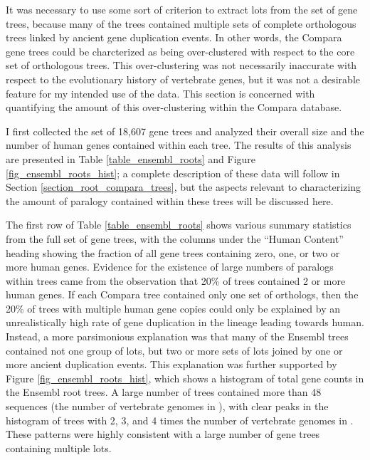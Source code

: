 It was necessary to use some sort of criterion to extract \acp{lot}
from the set of \cmp gene trees, because many of the \cmp trees
contained multiple sets of complete \mammln orthologous trees linked
by ancient gene duplication events. In other words, the Compara gene
trees could be charcterized as being over-clustered with respect to
the core set of \mammln orthologous trees. This over-clustering was
not necessarily inaccurate with respect to the evolutionary history of
vertebrate genes, but it was not a desirable feature for my intended
use of the data. This section is concerned with quantifying the amount
of this over-clustering within the Compara database.

I first collected the set of 18,607 \cmp gene trees and analyzed their
overall size and the number of human genes contained within each
tree. The results of this analysis are presented in Table
\ref{table_ensembl_roots} and Figure \ref{fig_ensembl_roots_hist}; a
complete description of these data will follow in Section
\ref{section_root_compara_trees}, but the aspects relevant to
characterizing the amount of paralogy contained within these trees
will be discussed here.

The first row of Table \ref{table_ensembl_roots} shows various summary
statistics from the full set of \cmp gene trees, with the columns
under the ``Human Content'' heading showing the fraction of all gene
trees containing zero, one, or two or more human genes. Evidence for
the existence of large numbers of paralogs within \cmp trees came from
the observation that 20\% of \cmp trees contained 2 or more human
genes. If each Compara tree contained only one set of \mammln
orthologs, then the 20\% of trees with multiple human gene copies
could only be explained by an unrealistically high rate of gene
duplication in the lineage leading towards human. Instead, a more
parsimonious explanation was that many of the Ensembl trees contained
not one group of \mammln \acp{lot}, but two or more sets of \mammln
\acp{lot} joined by one or more ancient duplication events. This
explanation was further supported by Figure \ref{fig_ensembl_roots_hist},
which shows a histogram of total gene counts in the Ensembl root
trees. A large number of trees contained more than 48 sequences (the
number of vertebrate genomes in \ens), with clear peaks in the
histogram of trees with 2, 3, and 4 times the number of vertebrate
genomes in \ens. These patterns were highly consistent with a large
number of \cmp gene trees containing multiple \mammln \acp{lot}.

